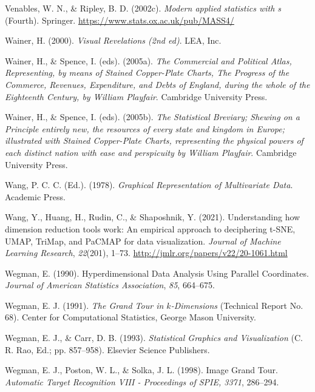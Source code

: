 \documentclass[
  letterpaper,
]{krantz}
\newlength{\cslhangindent}
\newenvironment{CSLReferences}[2] %
 {\begin{list}{}{%
  \setlength{\itemindent}{0pt}
  \setlength{\leftmargin}{0pt}
  \setlength{\parsep}{0pt}
  \ifodd #1
   \setlength{\leftmargin}{\cslhangindent}
   \setlength{\itemindent}{-1\cslhangindent}
  \fi
  \setlength{\itemsep}{#2\baselineskip}}}
 {\end{list}}
\begin{document}
\begin{CSLReferences}{1}{0}
Venables, W. N., \& Ripley, B. D. (2002c). \emph{Modern applied
statistics with s} (Fourth). Springer.
\url{https://www.stats.ox.ac.uk/pub/MASS4/}

Wainer, H. (2000). \emph{Visual {R}evelations (2nd ed)}. LEA, Inc.

Wainer, H., \& Spence, I. (eds). (2005a). \emph{The {C}ommercial and
{P}olitical {A}tlas, {R}epresenting, by means of {S}tained
{C}opper-{P}late {C}harts, {T}he {P}rogress of the {C}ommerce,
{R}evenues, {E}xpenditure, and {D}ebts of {E}ngland, during the whole of
the {E}ighteenth {C}entury, by {W}illiam {P}layfair}. Cambridge
University Press.

Wainer, H., \& Spence, I. (eds). (2005b). \emph{The {S}tatistical
{B}reviary; {S}hewing on a {P}rinciple entirely new, the resources of
every state and kingdom in {E}urope; illustrated with {S}tained
{C}opper-{P}late {C}harts, representing the physical powers of each
distinct nation with ease and perspicuity by {W}illiam {P}layfair}.
Cambridge University Press.

Wang, P. C. C. (Ed.). (1978). \emph{{G}raphical {R}epresentation of
{M}ultivariate {D}ata}. Academic Press.

Wang, Y., Huang, H., Rudin, C., \& Shaposhnik, Y. (2021). Understanding
how dimension reduction tools work: An empirical approach to deciphering
t-SNE, UMAP, TriMap, and PaCMAP for data visualization. \emph{Journal of
Machine Learning Research}, \emph{22}(201), 1--73.
\url{http://jmlr.org/papers/v22/20-1061.html}

Wegman, E. (1990). {H}yperdimensional {D}ata {A}nalysis {U}sing
{P}arallel {C}oordinates. \emph{Journal of American Statistics
Association}, \emph{85}, 664--675.

Wegman, E. J. (1991). \emph{The {G}rand {T}our in \(k\)-{D}imensions}
(Technical Report No. 68). Center for Computational Statistics, George
Mason University.

Wegman, E. J., \& Carr, D. B. (1993). \emph{{S}tatistical {G}raphics and
{V}isualization} (C. R. Rao, Ed.; pp. 857--958). Elsevier Science
Publishers.

Wegman, E. J., Poston, W. L., \& Solka, J. L. (1998). Image {G}rand
{T}our. \emph{Automatic Target Recognition VIII - Proceedings of SPIE,
3371}, 286--294.


\end{CSLReferences}
\end{document}
